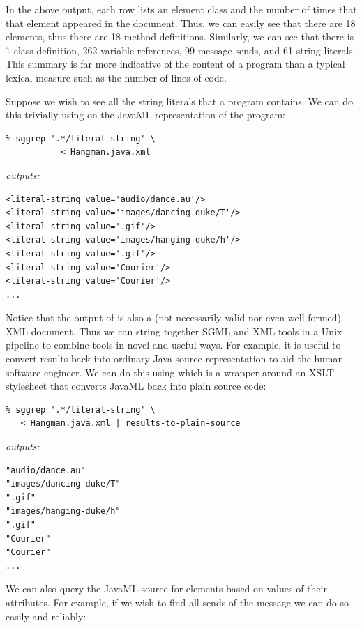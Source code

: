 \documentclass{article}
\begin{document}
\begin{multicols}{2}
In the above output, each row lists an element class and the number of
times that that element appeared in the document.  Thus, we can easily
see that there are 18  elements, thus there are 18
method definitions.  Similarly, we can see that there is 1 class
definition, 262 variable references, 99 message sends, and 61 string
literals.  This summary is far more indicative of the content of a
program than a typical lexical measure such as the number of lines of
code.

Suppose we wish to see all the string literals that a program contains.
We can do this trivially using  on the JavaML
representation of the program:

\begin{verbatim}
% sggrep '.*/literal-string' \
           < Hangman.java.xml
\end{verbatim}

\noindent\emph{outputs:}
{\small
\begin{verbatim}
<literal-string value='audio/dance.au'/>
<literal-string value='images/dancing-duke/T'/>
<literal-string value='.gif'/>
<literal-string value='images/hanging-duke/h'/>
<literal-string value='.gif'/>
<literal-string value='Courier'/>
<literal-string value='Courier'/>
...
\end{verbatim}
}

\noindent Notice that the output of  is also a (not necessarily
valid nor even well-formed) XML document.  Thus we can string together
SGML and XML tools in a Unix pipeline to combine tools in novel and
useful ways.  For example, it is useful to convert results back into
ordinary Java source representation to aid the human software-engineer.
We can do this using  which is a
wrapper around an XSLT stylesheet that converts JavaML back into
plain source code:

\begin{verbatim}
% sggrep '.*/literal-string' \
   < Hangman.java.xml | results-to-plain-source
\end{verbatim}

\noindent\emph{outputs:}
\begin{verbatim}
"audio/dance.au"
"images/dancing-duke/T"
".gif"
"images/hanging-duke/h"
".gif"
"Courier"
"Courier"
...
\end{verbatim}

We can also query the JavaML source for elements based on values of
their attributes.  For example, if we wish to find all sends of the
message  we can do so easily and reliably:


\end{multicols}
\end{document}
